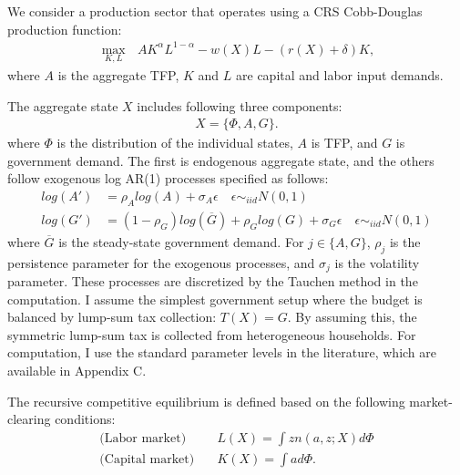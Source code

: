 We consider a production sector that operates using a CRS Cobb-Douglas production function:
\begin{align}
  \max_{K,L}\text{ } AK^{\alpha}L^{1-\alpha} - w(X)L - (r(X)+\delta)K,
\end{align}
where $A$ is the aggregate TFP, $K$ and $L$ are capital and labor input demands. 

The aggregate state $X$ includes following three components:
\begin{align}
  X = \{\Phi,A,G\}.
\end{align}
where $\Phi$ is the distribution of the individual states, $A$ is TFP, and $G$ is government demand. The first is endogenous aggregate state, and the others follow exogenous log AR(1) processes specified as follows:
\begin{align}
  log(A') &= \rho_{A}log(A) + \sigma_{A}\epsilon\quad \epsilon\sim_{iid} N(0,1)
  \\
  log(G') &= (1-\rho_{G})log(\overline{G})+\rho_{G}log(G) + \sigma_{G}\epsilon\quad \epsilon\sim_{iid} N(0,1)
\end{align}
where $\overline{G}$ is the steady-state government demand. For $j\in\{A,G\}$,
$\rho_{j}$ is the persistence parameter for the exogenous processes, and $\sigma_{j}$ is the volatility parameter. These processes are discretized by the Tauchen method in the computation.
I assume the simplest government setup where the budget is balanced by lump-sum tax collection: $T(X) = G$. By assuming this, the symmetric lump-sum tax is collected from heterogeneous households.
For computation, I use the standard parameter levels in the literature, which are available in Appendix C. 

The recursive competitive equilibrium is defined based on the following market-clearing conditions:
\begin{align}
    \text{(Labor market)}&\quad L(X) = \int zn(a,z;X)d\Phi
    \\
    \text{(Capital market)}&\quad K(X) = \int a d\Phi.
\end{align}
